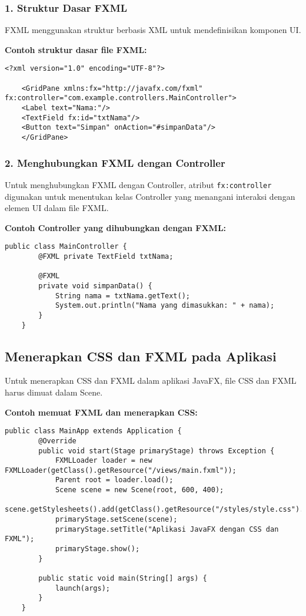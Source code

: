 \subsubsection{1. Struktur Dasar FXML}

FXML menggunakan struktur berbasis XML untuk mendefinisikan komponen UI.

\textbf{Contoh struktur dasar file FXML:}
\begin{lstlisting}[style=XmlStyle, caption=Struktur dasar file FXML]
	<?xml version="1.0" encoding="UTF-8"?>
	
	<GridPane xmlns:fx="http://javafx.com/fxml" fx:controller="com.example.controllers.MainController">
	<Label text="Nama:"/>
	<TextField fx:id="txtNama"/>
	<Button text="Simpan" onAction="#simpanData"/>
	</GridPane>
\end{lstlisting}

\subsubsection{2. Menghubungkan FXML dengan Controller}

Untuk menghubungkan FXML dengan Controller, atribut \texttt{fx:controller} digunakan untuk menentukan kelas Controller yang menangani interaksi dengan elemen UI dalam file FXML.

\textbf{Contoh Controller yang dihubungkan dengan FXML:}
\begin{lstlisting}[style=JavaStyle, caption=MainController.java]
	public class MainController {
		@FXML private TextField txtNama;
		
		@FXML
		private void simpanData() {
			String nama = txtNama.getText();
			System.out.println("Nama yang dimasukkan: " + nama);
		}
	}
\end{lstlisting}

\subsection{Menerapkan CSS dan FXML pada Aplikasi}

Untuk menerapkan CSS dan FXML dalam aplikasi JavaFX, file CSS dan FXML harus dimuat dalam Scene.

\textbf{Contoh memuat FXML dan menerapkan CSS:}
\begin{lstlisting}[style=JavaStyle, caption=Memuat FXML dan CSS dalam JavaFX]
	public class MainApp extends Application {
		@Override
		public void start(Stage primaryStage) throws Exception {
			FXMLLoader loader = new FXMLLoader(getClass().getResource("/views/main.fxml"));
			Parent root = loader.load();
			Scene scene = new Scene(root, 600, 400);
			scene.getStylesheets().add(getClass().getResource("/styles/style.css").toExternalForm());
			primaryStage.setScene(scene);
			primaryStage.setTitle("Aplikasi JavaFX dengan CSS dan FXML");
			primaryStage.show();
		}
		
		public static void main(String[] args) {
			launch(args);
		}
	}
\end{lstlisting}

